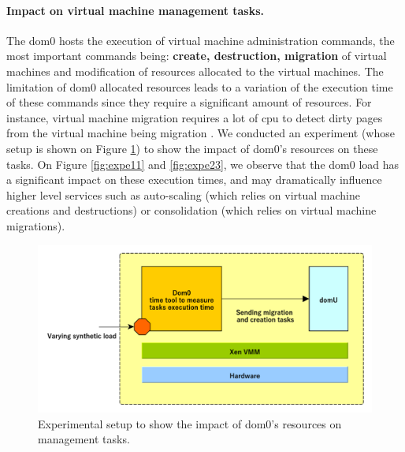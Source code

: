 \paragraph{Impact on virtual machine management tasks.} The dom0 hosts the execution of virtual machine administration commands, the most important commands being: \textbf{create, destruction, migration} of virtual machines and modification of resources allocated to the virtual machines. The limitation of dom0 allocated resources leads to a variation of the execution time of these commands since they require a significant amount of resources. For instance, virtual machine migration requires a lot of \acrshort{cpu} to detect dirty pages from the virtual machine being migration \citep{livemigration,livemigration2}. We conducted an experiment (whose setup is shown on Figure \ref{fig:expe3}) to show the impact of dom0's resources on these tasks. On Figure \ref{fig:expe11} and \ref{fig:expe23}, we observe that the dom0 load has a significant impact on these execution times, and may dramatically influence higher level services such as auto-scaling (which relies on virtual machine creations and destructions) or consolidation (which relies on virtual machine migrations). 

\begin{figure}[!h]
    \centering
    \includegraphics[scale=0.65]{fig03/expe3.pdf}
    \caption{Experimental setup to show the impact of dom0's resources on management tasks.}
    \label{fig:expe3}
\end{figure}

